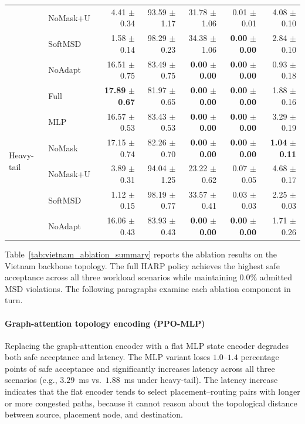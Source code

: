 \documentclass[final,5p]{elsarticle}
\begin{document}
\begin{table}[t]
{\begin{tabular}{llrrrrr}
& NoMask+U & 4.41 $\pm$ 0.34 & 93.59 $\pm$ 1.17 & 31.78 $\pm$ 1.06 & 0.01 $\pm$ 0.01 & 4.08 $\pm$ 0.10 \\
& SoftMSD & 1.58 $\pm$ 0.14 & 98.29 $\pm$ 0.23 & 34.38 $\pm$ 1.06 & \textbf{0.00} $\pm$ \textbf{0.00} & 2.84 $\pm$ 0.10 \\
& NoAdapt & 16.51 $\pm$ 0.75 & 83.49 $\pm$ 0.75 & \textbf{0.00} $\pm$ \textbf{0.00} & \textbf{0.00} $\pm$ \textbf{0.00} & 0.93 $\pm$ 0.18 \\
\midrule
\multirow{6}{*}{Heavy-tail}
& Full & \textbf{17.89} $\pm$ \textbf{0.67} & 81.97 $\pm$ 0.65 & \textbf{0.00} $\pm$ \textbf{0.00} & \textbf{0.00} $\pm$ \textbf{0.00} & 1.88 $\pm$ 0.16 \\
& MLP & 16.57 $\pm$ 0.53 & 83.43 $\pm$ 0.53 & \textbf{0.00} $\pm$ \textbf{0.00} & \textbf{0.00} $\pm$ \textbf{0.00} & 3.29 $\pm$ 0.19 \\
& NoMask & 17.15 $\pm$ 0.74 & 82.26 $\pm$ 0.70 & \textbf{0.00} $\pm$ \textbf{0.00} & \textbf{0.00} $\pm$ \textbf{0.00} & \textbf{1.04} $\pm$ \textbf{0.11} \\
& NoMask+U & 3.89 $\pm$ 0.31 & 94.04 $\pm$ 1.25 & 23.22 $\pm$ 0.62 & 0.07 $\pm$ 0.05 & 4.68 $\pm$ 0.17 \\
& SoftMSD & 1.12 $\pm$ 0.15 & 98.19 $\pm$ 0.77 & 33.57 $\pm$ 0.41 & 0.03 $\pm$ 0.03 & 2.25 $\pm$ 0.03 \\
& NoAdapt & 16.06 $\pm$ 0.43 & 83.93 $\pm$ 0.43 & \textbf{0.00} $\pm$ \textbf{0.00} & \textbf{0.00} $\pm$ \textbf{0.00} & 1.71 $\pm$ 0.26 \\
\bottomrule
\end{tabular}
}
\end{table}

Table~\ref{tab:vietnam_ablation_summary} reports the ablation results on the Vietnam backbone topology. The full HARP policy achieves the highest safe acceptance across all three workload scenarios while maintaining \(0.0\%\) admitted MSD violations. The following paragraphs examine each ablation component in turn.

\paragraph{Graph-attention topology encoding (PPO-MLP)}
Replacing the graph-attention encoder with a flat MLP state encoder degrades both safe acceptance and latency. The MLP variant loses \(1.0\)--\(1.4\) percentage points of safe acceptance and significantly increases latency across all three scenarios (e.g., \(3.29\)~ms vs.\ \(1.88\)~ms under heavy-tail). The latency increase indicates that the flat encoder tends to select placement--routing pairs with longer or more congested paths, because it cannot reason about the topological distance between source, placement node, and destination.
\end{document}
